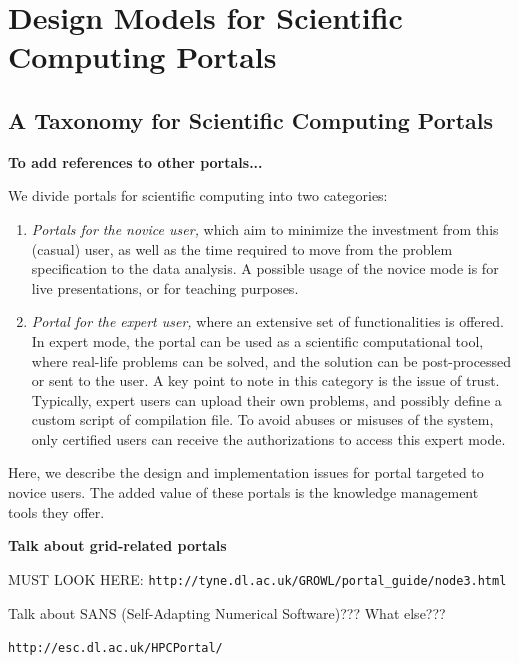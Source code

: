 \documentclass[11pt,relax]{SANDreport}
\begin{document}
\section{Design Models for Scientific Computing Portals}
\label{sec:design}

\subsection{A Taxonomy for Scientific Computing Portals}

{\bf To add references to other portals...}

We divide portals for scientific computing into two categories:
\begin{enumerate}
\setlength{\itemsep}{0pt}
\item {\sl Portals for the novice user,} which aim to minimize the investment
from this (casual) user, as well as the time required to move from the problem
specification to the data analysis. A possible usage of the novice mode is for
live presentations, or for teaching purposes.
\item {\sl Portal for the expert user,} where an extensive set of
functionalities is offered. In expert mode, the portal can be used as a
scientific computational tool, where real-life problems can be solved, and the
solution can be post-processed or sent to the user.
A key point to note in this category is the issue
of trust. Typically, expert users can upload their own problems, and possibly
define a custom script of compilation file. To avoid abuses or misuses of the
system, only certified users can receive the authorizations to access this
expert mode.
\end{enumerate}
Here, we describe the design and implementation issues for portal targeted to
novice users. The added value of these portals is the knowledge management
tools they offer.

{\bf Talk about grid-related portals}

\bigskip

MUST LOOK HERE: \verb!http://tyne.dl.ac.uk/GROWL/portal_guide/node3.html!

Talk about SANS (Self-Adapting Numerical Software)??? What else???

\verb!http://esc.dl.ac.uk/HPCPortal/!
\end{document}
